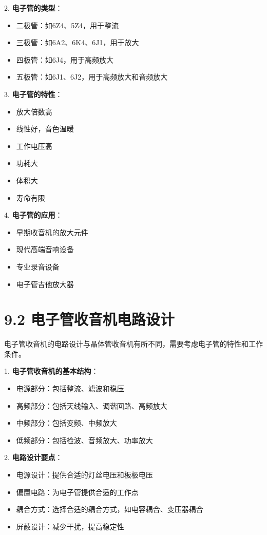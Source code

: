 \documentclass[12pt,UTF8]{ctexbook}
\begin{document}
2. \textbf{电子管的类型}：
   \begin{itemize}[leftmargin=3.5em]
   \item 二极管：如6Z4、5Z4，用于整流
   \item 三极管：如6A2、6K4、6J1，用于放大
   \item 四极管：如6J4，用于高频放大
   \item 五极管：如6J1、6J2，用于高频放大和音频放大
   \end{itemize}

3. \textbf{电子管的特性}：
   \begin{itemize}[leftmargin=3.5em]
   \item 放大倍数高
   \item 线性好，音色温暖
   \item 工作电压高
   \item 功耗大
   \item 体积大
   \item 寿命有限
   \end{itemize}

4. \textbf{电子管的应用}：
   \begin{itemize}[leftmargin=3.5em]
   \item 早期收音机的放大元件
   \item 现代高端音响设备
   \item 专业录音设备
   \item 电子管吉他放大器
   \end{itemize}

\section*{9.2 电子管收音机电路设计}

电子管收音机的电路设计与晶体管收音机有所不同，需要考虑电子管的特性和工作条件。

1. \textbf{电子管收音机的基本结构}：
   \begin{itemize}[leftmargin=3.5em]
   \item 电源部分：包括整流、滤波和稳压
   \item 高频部分：包括天线输入、调谐回路、高频放大
   \item 中频部分：包括变频、中频放大
   \item 低频部分：包括检波、音频放大、功率放大
   \end{itemize}

2. \textbf{电路设计要点}：
   \begin{itemize}[leftmargin=3.5em]
   \item 电源设计：提供合适的灯丝电压和板极电压
   \item 偏置电路：为电子管提供合适的工作点
   \item 耦合方式：选择合适的耦合方式，如电容耦合、变压器耦合
   \item 屏蔽设计：减少干扰，提高稳定性
   \end{itemize}
\end{document}
